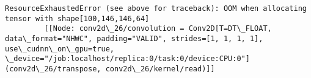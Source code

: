 \documentclass[11pt]{article}
\begin{document}
\begin{Verbatim}[commandchars=\\\{\}]
    ResourceExhaustedError (see above for traceback): OOM when allocating tensor with shape[100,146,146,64]
    	 [[Node: conv2d\_26/convolution = Conv2D[T=DT\_FLOAT, data\_format="NHWC", padding="VALID", strides=[1, 1, 1, 1], use\_cudnn\_on\_gpu=true, \_device="/job:localhost/replica:0/task:0/device:CPU:0"](conv2d\_26/transpose, conv2d\_26/kernel/read)]]
    

    \end{Verbatim}


    
    
    
    
\end{document}
